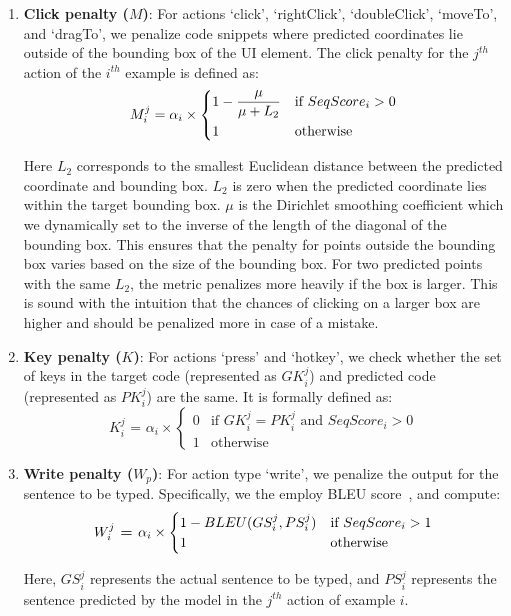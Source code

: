 \begin{enumerate}
    \item \textbf{Click penalty ($M$)}: For actions  `click', `rightClick', `doubleClick', `moveTo', and `dragTo', we penalize code snippets where predicted coordinates lie outside of the bounding box of the UI element. The click penalty for the $j^{th}$ action of the $i^{th}$ example is defined as:
\begin{equation}
\textbf{$M_i^j$} =  \alpha_i \times 
\begin{dcases}
    1 - \frac{\mu}{\mu+L_2} & \text{if $SeqScore_i$} > 0\\
    1 & \text{otherwise}
\end{dcases}
\end{equation}

Here $L_2$ corresponds to the smallest Euclidean distance between the predicted coordinate and bounding box. $ L_2$ is zero when the predicted coordinate lies within the target bounding box. $\mu$ is the Dirichlet smoothing coefficient which we dynamically set to the inverse of the length of the diagonal of the bounding box. This ensures that the penalty for points outside the bounding box varies based on the size of the bounding box. For two predicted points with the same $L_2$, the metric penalizes more heavily if the box is larger. This is sound with the intuition that the chances of clicking on a larger box are higher and should be penalized more in case of a mistake. 
    \item \textbf{Key penalty ($K$)}: For actions `press' and `hotkey', we check whether the set of keys in the target code (represented as $GK_i^j$) and predicted code (represented as $PK_i^j$) are the same. It is formally defined as:
\setlength{\abovedisplayskip}{3pt}
\setlength{\belowdisplayskip}{3pt}
\begin{equation}
\textbf{$K_i^j$ = }
\alpha_i \times
  \begin{cases}
    0 & \text{if  }GK_i^j = PK_i^j \text{ and } SeqScore_i > 0\\
    1 & \text{otherwise}
  \end{cases}
\end{equation}
    \item \textbf{Write penalty ($W_p$)}: For action type `write', we penalize the output for the sentence to be typed. Specifically, we the employ BLEU score~\cite{papineni2002bleu}, and compute:
\setlength{\abovedisplayskip}{3pt}
\setlength{\belowdisplayskip}{3pt}
\begin{equation}
\textbf{$W_i^j$ = }
\alpha_i \times
\begin{cases}
    \text 1- {BLEU}(GS_i^j, PS_i^j) & \text{if } SeqScore_i>1 \\
    1 & \text{otherwise}    
\end{cases} 
\end{equation}

Here, $GS_i^j$ represents the actual sentence to be typed, and $PS_i^j$ represents the sentence predicted by the model in the $j^{th}$ action of example $i$. 
\end{enumerate}

